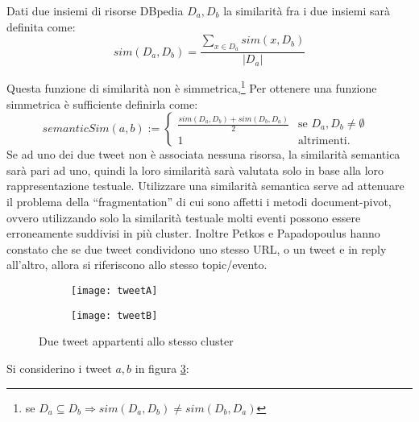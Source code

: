 Dati due insiemi di risorse DBpedia $D_a,D_b$ la similarità fra i due insiemi sarà definita come: 
\begin{equation}
sim(D_a,D_b)=\frac{\sum\limits_{x \in D_a} sim(x,D_b)  }{|D_a|} 
\end{equation}

Questa funzione di similarità non è simmetrica,\footnote{se $D_a\subseteq D_b\Rightarrow sim(D_a,D_b)\neq sim(D_b,D_a) $}
Per ottenere una funzione simmetrica è sufficiente definirla come: 
\begin{equation*} 
semanticSim(a,b):= 
\begin{cases}
\frac{sim(D_a,D_b)+sim(D_b,D_a)}{2} & \text{se $D_a,D_b\neq \emptyset$ }\\
1& \text{altrimenti.}

\end{cases}
\end{equation*}
Se ad uno dei due tweet non è associata nessuna risorsa, la similarità semantica sarà pari ad uno, quindi la loro similarità sarà valutata  solo in base alla loro rappresentazione testuale.
Utilizzare una similarità semantica serve ad attenuare il problema della “fragmentation” di cui sono affetti i metodi document-pivot, ovvero utilizzando solo la similarità testuale molti eventi possono essere erroneamente suddivisi in più cluster.  Inoltre Petkos e Papadopoulus \cite{DBLP:conf/www/PetkosPK14}  hanno constato che se due tweet condividono uno stesso URL, o  un tweet e in reply all’altro, allora si riferiscono allo stesso topic/evento.
 
\begin{figure}
    \centering
    \begin{subfigure}[b]{0.45\textwidth}
        \centering
        \texttt{[image: tweetA]}
        \caption{}
        \label{fig:tweeta}
    \end{subfigure}
    \hfill
    \begin{subfigure}[b]{0.45\textwidth}
        \centering
        \texttt{[image: tweetB]}
       \caption{}
        \label{fig:tweetb}
    \end{subfigure}
    \hfill
    
    \caption{Due tweet appartenti allo stesso cluster}
    \label{fig:twotweets}
\end{figure} 
Si considerino i tweet $a,b$ in figura \ref{fig:twotweets}:

